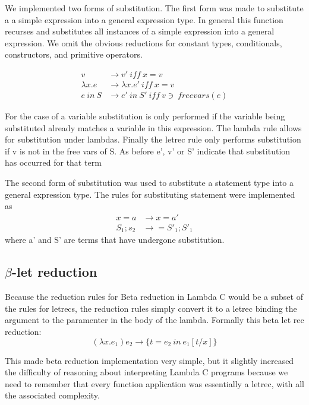 \documentclass[preprint]{sigplanconf}
\begin{document}
We implemented two forms of substitution. The first form was made to substitute a a simple expression into a general expression type. In general this function recurses and substitutes all instances of a simple expression into a general expression. We omit the obvious reductions for constant types, conditionals, constructors, and primitive 
operators.   

\begin{align}
v &\rightarrow v'\ iff\ x = v\\
\lambda x.e &\rightarrow \lambda x.e'\ iff\ x = v\\
{ e\ in\ S } &\rightarrow {e'\ in\ S'}\ iff\ v \ni\ freevars(e)
\end{align}

For the case of a variable substitution is only performed if the variable being substituted already matches a variable in this expression. The lambda rule allows for substitution under lambdas. Finally the letrec rule only performs substitution if v is not in the free vars of S. As before e', v' or S' indicate that substitution has occurred for that term 

The second form of substitution was used to substitute a statement type into a general expression type. The rules for substituting statement were implemented as
\begin{align}
x=a &\rightarrow x=a'\\
S_{1} ; s_{2} &\rightarrow = S'_{1} ; S'_{1}
\end{align}
where a' and S' are terms that have undergone substitution. 

\subsection{$\beta$-let reduction}
Because the reduction rules for Beta reduction in Lambda C would be a subset of the rules for letrecs,  the reduction rules simply convert it to a letrec binding the argument to the paramenter in the body of the lambda. Formally this beta let rec reduction: 
\begin{equation}
(\lambda x.e_{1})e_{2} \rightarrow \lbrace t = e_{2}\ in\ e_{1}[t/x] \rbrace
\end{equation}

This made beta reduction implementation very simple, but it slightly increased the difficulty of reasoning about interpreting Lambda C programs because we need to remember that every function application was essentially a letrec, with all the associated complexity.
\end{document}
